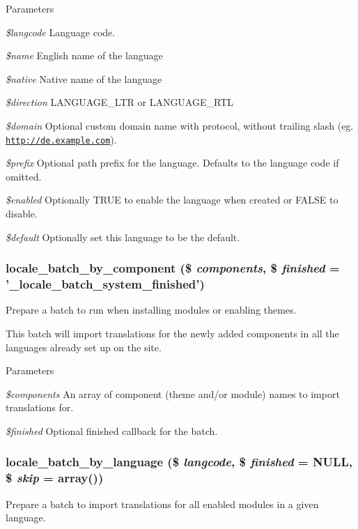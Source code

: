 \begin{DoxyParams}{Parameters}
\item[{\em \$langcode}]Language code. \item[{\em \$name}]English name of the language \item[{\em \$native}]Native name of the language \item[{\em \$direction}]LANGUAGE\_\-LTR or LANGUAGE\_\-RTL \item[{\em \$domain}]Optional custom domain name with protocol, without trailing slash (eg. \href{http://de.example.com}{\tt http://de.example.com}). \item[{\em \$prefix}]Optional path prefix for the language. Defaults to the language code if omitted. \item[{\em \$enabled}]Optionally TRUE to enable the language when created or FALSE to disable. \item[{\em \$default}]Optionally set this language to be the default. \end{DoxyParams}
\hypertarget{group__locale_gaa6ec98b4c2d6b82b6f206bafcf7d2ce6}{
\subsubsection[{locale\_\-batch\_\-by\_\-component}]{\setlength{\rightskip}{0pt plus 5cm}locale\_\-batch\_\-by\_\-component (\$ {\em components}, \/  \$ {\em finished} = {\ttfamily '\_\-locale\_\-batch\_\-system\_\-finished'})}}
\label{group__locale_gaa6ec98b4c2d6b82b6f206bafcf7d2ce6}
Prepare a batch to run when installing modules or enabling themes.

This batch will import translations for the newly added components in all the languages already set up on the site.


\begin{DoxyParams}{Parameters}
\item[{\em \$components}]An array of component (theme and/or module) names to import translations for. \item[{\em \$finished}]Optional finished callback for the batch. \end{DoxyParams}
\hypertarget{group__locale_ga2c34cb914394a45fb4e94561bfc26b71}{
\subsubsection[{locale\_\-batch\_\-by\_\-language}]{\setlength{\rightskip}{0pt plus 5cm}locale\_\-batch\_\-by\_\-language (\$ {\em langcode}, \/  \$ {\em finished} = {\ttfamily NULL}, \/  \$ {\em skip} = {\ttfamily array()})}}
\label{group__locale_ga2c34cb914394a45fb4e94561bfc26b71}
Prepare a batch to import translations for all enabled modules in a given language.


